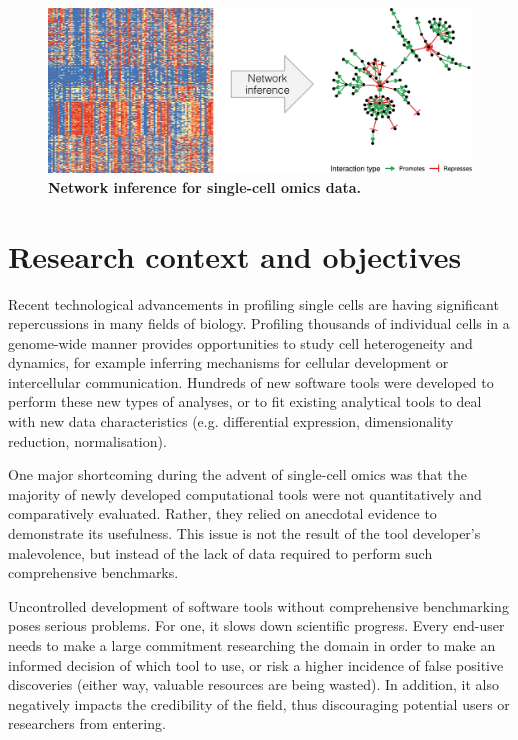 \begin{figure}[htb!]
	\centering
	\includegraphics[width=.6\linewidth]{fig/comptools2/comptool_5_networkinference.pdf}
	\caption{
		\textbf{Network inference for single-cell omics data.}
	}
	\label{fig:comp_tools_ni}
\end{figure}



\section{Research context and objectives} \label{sec:research_objectives}
Recent technological advancements in profiling single cells are having significant repercussions in many fields of biology. Profiling thousands of individual cells in a genome-wide manner provides opportunities to study cell heterogeneity and dynamics, for example inferring mechanisms for cellular development or intercellular communication. 
Hundreds of new software tools were developed\cite{zappia_exploringsinglecellrnaseq_2018} to perform these new types of analyses, or to fit existing analytical tools to deal with new data characteristics (e.g. differential expression, dimensionality reduction, normalisation). 

One major shortcoming during the advent of single-cell omics was that the majority of newly developed computational tools were not quantitatively and comparatively evaluated. Rather, they relied on anecdotal evidence to demonstrate its usefulness. This issue is not the result of the tool developer's malevolence, but instead of the lack of data required to perform such comprehensive benchmarks.

Uncontrolled development of software tools without comprehensive benchmarking poses serious problems. 
For one, it slows down scientific progress. Every end-user needs to make a large commitment researching the domain in order to make an informed decision of which tool to use, or risk a higher incidence of false positive discoveries (either way, valuable resources are being wasted). In addition, it also negatively impacts the credibility of the field, thus discouraging potential users or researchers from entering.


